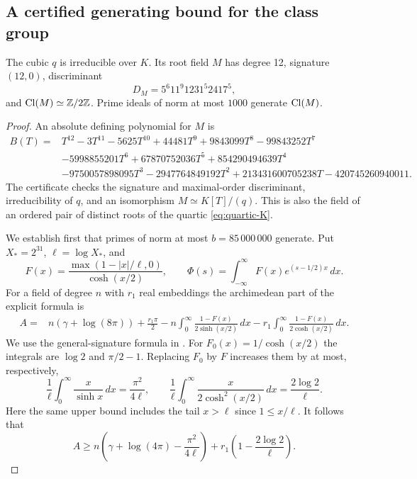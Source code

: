 \subsection{A certified generating bound for the class group}

\begin{lemma}\label{lem:type18-class-group}
The cubic $q$ is irreducible over $K$. Its root field $M$ has degree
12, signature $(12,0)$, discriminant
\[
 D_M=5^6 11^9 1231^5 2417^5,
\]
and $\operatorname{Cl}(M)\simeq\mathbb Z/2\mathbb Z$. Prime ideals of norm at most $1000$ generate
$\operatorname{Cl}(M)$.
\end{lemma}
\begin{proof}
An absolute defining polynomial for $M$ is
\begin{align*}
 B(T)={}&T^{12}-3T^{11}-5625T^{10}+44481T^9+9843099T^8
 -99843252T^7\\
 &-5998855201T^6+67870752036T^5+854290494639T^4\\
 &-9750057898095T^3-2947764849192T^2
 +213431600705238T-420745260940011.
\end{align*}
The certificate  checks the signature and
maximal-order discriminant, irreducibility of $q$, and an isomorphism
$M\simeq K[T]/(q)$. This is also the field of an ordered pair of
distinct roots of the quartic \eqref{eq:quartic-K}.

We establish first that primes of norm at most $b=85\,000\,000$
generate. Put $X_*=2^{31}$, $\ell=\log X_*$, and
\[
 F(x)=\frac{\max(1-|x|/\ell,0)}{\cosh(x/2)},\qquad
 \Phi(s)=\int_{-\infty}^{\infty}F(x)e^{(s-1/2)x}\,dx.
\]
For a field of degree $n$ with $r_1$ real embeddings the archimedean
part of the explicit formula is
\begin{align}\label{eq:explicit-arch}
 A={}&n(\gamma+\log(8\pi))+\frac{r_1\pi}{2}
 -n\int_0^\infty\frac{1-F(x)}{2\sinh(x/2)}\,dx
 -r_1\int_0^\infty\frac{1-F(x)}{2\cosh(x/2)}\,dx.
\end{align}
We use the general-signature formula in \cite[Section~4]{miller}.
For $F_0(x)=1/\cosh(x/2)$ the integrals are $\log2$ and $\pi/2-1$.
Replacing $F_0$ by $F$ increases them by at most, respectively,
\[
 \frac1\ell\int_0^\infty\frac{x}{\sinh x}\,dx
 =\frac{\pi^2}{4\ell},\qquad
 \frac1\ell\int_0^\infty\frac{x}{2\cosh^2(x/2)}\,dx
 =\frac{2\log2}{\ell}.
\]
Here the same upper bound includes the tail $x>\ell$ since $1\le x/\ell$.
It follows that
\begin{equation}\label{eq:arch-lower}
 A\ge n\left(\gamma+\log(4\pi)-\frac{\pi^2}{4\ell}\right)
       +r_1\left(1-\frac{2\log2}{\ell}\right).
\end{equation}


\end{proof}
